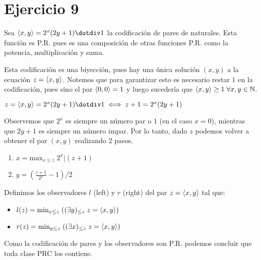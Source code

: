 \section*{Ejercicio 9}

Sea $\tupla{x}{y} = 2^x (2y + 1) \dotdiv 1$ la codificación de pares de naturales. Esta función es P.R. pues es una composición de otras funciones P.R. como la potencia, multiplicación y suma.

Esta codificación es una biyección, pues hay una única solución $(x, y)$ a la ecuación $z = \langle x, y \rangle$. Notemos que para garantizar esto es necesario restar $1$ en la codificación, pues sino el par $\langle 0, 0 \rangle = 1$ y luego sucedería que $\langle x, y \rangle \geq 1 \; \forall x,y \in \mathbb{N}$.

$z = \tupla{x}{y} = 2^x (2y + 1) \dotdiv 1 \iff z + 1 = 2^x (2y + 1)$

Observemos que $2^x$ es siempre un número par o $1$ (en el caso $x = 0$), mientras que $2y + 1$ es siempre un número impar. Por lo tanto, dado $z$ podemos volver a obtener el par $(x, y)$ realizando 2 pasos.

\begin{enumerate}
    \item $x = \text{max}_{x \leq z} \; 2^x | (z + 1)$
    \item $y = (\frac{z + 1}{2^x} - 1) / 2$
\end{enumerate}

Definimos los observadores $l$ (left) y $r$ (right) del par $z = \langle x, y \rangle$ tal que:

\begin{itemize}
    \item $l(z) = \text{min}_{x \leq z} \; ((\exists y)_{\leq z} \; z = \langle x, y \rangle)$
    \item $r(z) = \text{min}_{y \leq z} \; ((\exists x)_{\leq z} \; z = \langle x, y \rangle)$
\end{itemize}

Como la codificación de pares y los observadores son P.R. podemos concluir que toda clase PRC los contiene.
